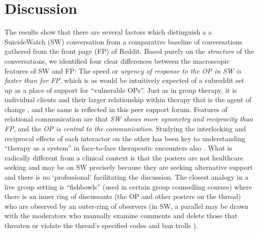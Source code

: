 \section{Discussion}

The results show that there are several factors which distinguish a a SuicideWatch (SW) conversation from a comparative baseline of  conversations gathered from the front page (FP) of Reddit. Based purely on the \textit{ structure} of the conversations, we identified four clear differences between the macroscopic features of SW and FP: 
The speed or \textit{urgency of response to the OP in SW is faster than for FP}, which is as would be intuitively expected of a subreddit set up as a place of support for “vulnerable OPs”.  
Just as in group therapy, it is individual clients and their larger relationship within therapy that is the agent of change \cite{yalom_theory_1995}, and the same is reflected in this peer support forum.   
Features of relational communication \cite{rogers_overview_1983} are that \textit{SW shows more symmetry and reciprocity than FP}, and the \textit{OP is central to the communication}. Studying the interlocking and reciprocal effects of each interactor on the other has been key to understanding “therapy as a system” in face-to-face therapeutic encounters also \cite{de_shazer_putting_1991}.
What is radically different from a clinical context is that the posters are not healthcare seeking and may be on SW precisely because they are seeking alternative support and there is no ‘professional’ facilitating the discussion.  The closest analogy in a live group setting is “fishbowls” (used in certain group counselling courses) \cite{keim_groupwork_2013} where there is an inner ring of discussants (the OP and other posters on the thread) who are observed by an outer-ring of observers (in SW, a parallel may be drawn with the moderators who manually examine comments and delete those that threaten or violate the thread’s specified codes
and ban trolls 
\cite{choudhury_language_2017}).


